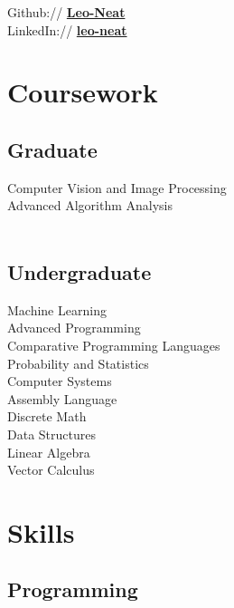 \documentclass[letterpaper]{deedy-resume} %
\begin{document}
\begin{minipage}[t]{0.33\textwidth}
Github:// \href{https://github.com/Leo-Neat}{\bf Leo-Neat} \\
LinkedIn:// \href{https://www.linkedin.com/in/leo-neat-82b34b130/}{\bf leo-neat} \\

\sectionspace %


\section{Coursework}

\subsection{Graduate}

Computer Vision and Image Processing \\
Advanced Algorithm Analysis \\\
\subsection{Undergraduate}

Machine Learning \\
Advanced Programming \\
Comparative Programming Languages \\
Probability and Statistics \\
Computer Systems \\
Assembly Language \\
Discrete Math \\
Data Structures \\
Linear Algebra \\
Vector Calculus \\


\sectionspace %


\section{Skills}

\subsection{Programming}


\end{minipage}
\end{document}
